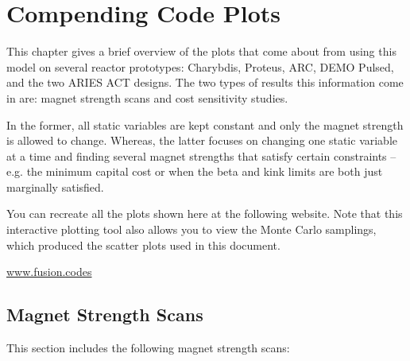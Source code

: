 %
%
%
%
%
%
%
%

\chapter{Compending Code Plots}

\label{chapter:extra}

This chapter gives a brief overview of the plots that come about from using this model on several reactor prototypes: Charybdis, Proteus, ARC, DEMO Pulsed, and the two ARIES ACT designs. The two types of results this information come in are: magnet strength scans and cost sensitivity studies.

In the former, all static variables are kept constant and only the magnet strength is allowed to change. Whereas, the latter focuses on changing one static variable at a time and finding several magnet strengths that satisfy certain constraints -- e.g. the minimum capital cost or when the beta and kink limits are both just marginally satisfied. 

You can recreate all the plots shown here at the following website. Note that this interactive plotting tool also allows you to view the Monte Carlo samplings, which produced the scatter plots used in this document.

{\centering \href{http://fusion.codes}{www.fusion.codes} \par }

\clearpage

\newpage

\section{Magnet Strength Scans}
\label{section:scans}

This section includes the following magnet strength scans: ~

